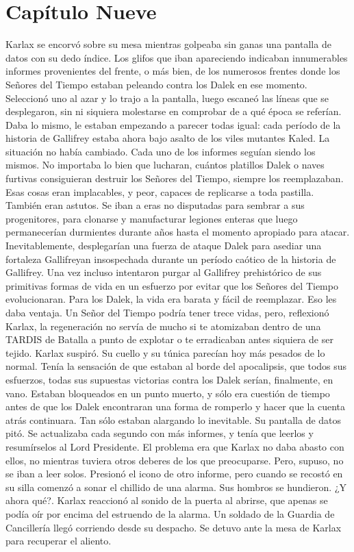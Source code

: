 \chapter*{Capítulo Nueve}

Karlax se encorvó sobre su mesa mientras golpeaba sin ganas una pantalla de datos con su dedo índice. Los glifos que iban apareciendo indicaban innumerables informes provenientes del frente, o más bien, de los numerosos frentes donde los Señores del Tiempo estaban peleando contra los Dalek en ese momento.
Seleccionó uno al azar y lo trajo a la pantalla, luego escaneó las líneas que se desplegaron, sin ni siquiera molestarse en comprobar de a qué época se referían. Daba lo mismo, le estaban empezando a parecer todas igual: cada período de la historia de Gallifrey estaba ahora bajo asalto de los viles mutantes Kaled.
La situación no había cambiado. Cada uno de los informes seguían siendo los mismos. No importaba lo bien que lucharan, cuántos platillos Dalek o naves furtivas consiguieran destruir los Señores del Tiempo, siempre los reemplazaban. Esas cosas eran implacables, y peor, capaces de replicarse a toda pastilla. También eran astutos. Se iban a eras no disputadas para sembrar a sus progenitores, para clonarse y manufacturar legiones enteras que luego permanecerían durmientes durante años hasta el momento apropiado para atacar. Inevitablemente, desplegarían una fuerza de ataque Dalek para asediar una fortaleza Gallifreyan insospechada durante un período caótico de la historia de Gallifrey. Una vez incluso intentaron purgar al Gallifrey prehistórico de sus primitivas formas de vida en un esfuerzo por evitar que los Señores del Tiempo evolucionaran.
Para los Dalek, la vida era barata y fácil de reemplazar. Eso les daba ventaja. Un Señor del Tiempo podría tener trece vidas, pero, reflexionó Karlax, la regeneración no servía de mucho si te atomizaban dentro de una TARDIS de Batalla a punto de explotar o te erradicaban antes siquiera de ser tejido.
Karlax suspiró. Su cuello y su túnica parecían hoy más pesados de lo normal. Tenía la sensación de que estaban al borde del apocalipsis, que todos sus esfuerzos, todas sus supuestas victorias contra los Dalek serían, finalmente, en vano. Estaban bloqueados en un punto muerto, y sólo era cuestión de tiempo antes de que los Dalek encontraran una forma de romperlo y hacer que la cuenta atrás continuara. Tan sólo estaban alargando lo inevitable.
Su pantalla de datos pitó. Se actualizaba cada segundo con más informes, y tenía que leerlos y resumírselos al Lord Presidente. El problema era que Karlax no daba abasto con ellos, no mientras tuviera otros deberes de los que preocuparse. Pero, supuso, no se iban a leer solos. Presionó el icono de otro informe, pero cuando se recostó en su silla comenzó a sonar el chillido de una alarma. Sus hombros se hundieron. ¿Y ahora qué?.
Karlax reaccionó al sonido de la puerta al abrirse, que apenas se podía oír por encima del estruendo de la alarma. Un soldado de la Guardia de Cancillería llegó corriendo desde su despacho. Se detuvo ante la mesa de Karlax para recuperar el aliento.

